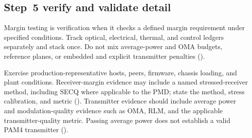 \subsection{Step~5 verify and validate detail}
\label{sec:ladder-verify}
\label{sec:ladder-system-validation}

Margin testing is verification when it checks a defined margin requirement under
specified conditions. Track optical, electrical, thermal, and control ledgers
separately and stack once. Do not mix average-power and
OMA
budgets, reference planes, or embedded and explicit transmitter penalties
().

Exercise production-representative hosts, peers, firmware, chassis loading, and
plant conditions. Receiver-margin evidence may include a named stressed-receiver
method, including SECQ where applicable to the
PMD;
state the method, stress calibration, and metric
(). Transmitter evidence should include average power and
modulation-quality evidence such as OMA,
RLM,
and the applicable transmitter-quality metric. Passing average power does not
establish a valid PAM4 transmitter
().

